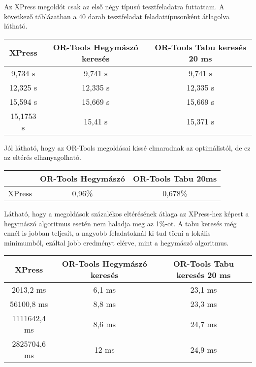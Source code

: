Az XPress megoldót csak az első négy típusú tesztfeladatra futtattam. A következő táblázatban a 40 darab tesztfeladat feladattípusonként átlagolva látható.

\begin{center}
 \begin{tabular}{ |c|c|c| } 
\hline
XPress & OR-Tools Hegymászó keresés & OR-Tools Tabu keresés 20 ms \\
\hline

 9,734 s & 9,741 s & 9,741 s\\ 
 12,325 s & 12,335 s & 12,335 s\\ 
 15,594 s & 15,669 s & 15,669 s\\ 
 15,1753 s & 15,41 s & 15,371 s\\
\hline
\end{tabular}
\end{center}

Jól látható, hogy az OR-Tools megoldásai kissé elmaradnak az optimálistól, de ez az eltérés elhanyagolható.

\begin{center}
 \begin{tabular}{ |c|c|c| } 
\hline

 & OR-Tools Hegymászó& OR-Tools Tabu 20ms\\ 
\hline
 XPress & 0,96\% & 0,678\%\\ 
 
\hline
\end{tabular}
\end{center}

Látható, hogy a megoldások százalékos eltérésének átlaga az XPress-hez képest a hegymászó algoritmus esetén nem haladja meg az 1\%-ot. A tabu keresés még ennél is jobban teljesít, a nagyobb feladatoknál ki tud törni a lokális minimumból, ezáltal jobb eredményt elérve, mint a hegymászó algoritmus.


\begin{center}
 \begin{tabular}{ |c|c|c| } 
\hline
XPress & OR-Tools Hegymászó keresés & OR-Tools Tabu keresés 20 ms \\
\hline

2013,2 ms & 6,1 ms & 23,1 ms\\ 
 56100,8 ms & 8,8 ms & 23,3 ms\\ 
 1111642,4 ms & 8,6 ms & 24,7 ms\\ 
 2825704,6 ms & 12 ms & 24,9 ms\\
\hline
\end{tabular}
\end{center}

